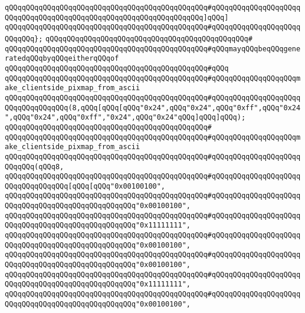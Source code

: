 \verb|qQQqqQQqqQQqqQQqqQQqqQQqqQQqqQQqqQQqqQQqqQQqqQQq#qQQqqQQqqQQqqQQqqQQqqQQqqQQqqQQqqQQqqQQqqQQqqQQqqQQqqQQqqQQqqQQqqQQq]qQQq]|\newline
\verb|qQQqqQQqqQQqqQQqqQQqqQQqqQQqqQQqqQQqqQQqqQQqqQQq#qQQqqQQqqQQqqQQqqQQqqQQqqQQq};|\newline
\verb|qQQqqQQqqQQqqQQqqQQqqQQqqQQqqQQqqQQqqQQqqQQqqQQq#|\newline
\verb|qQQqqQQqqQQqqQQqqQQqqQQqqQQqqQQqqQQqqQQqqQQqqQQq#qQQqmayqQQqbeqQQqgeneratedqQQqbyqQQqeitherqQQqof|\newline
\verb|qQQqqQQqqQQqqQQqqQQqqQQqqQQqqQQqqQQqqQQqqQQqqQQq#qQQq|\newline
\verb|qQQqqQQqqQQqqQQqqQQqqQQqqQQqqQQqqQQqqQQqqQQqqQQq#qQQqqQQqqQQqqQQqqQQqmake_clientside_pixmap_from_ascii|\newline
\verb|qQQqqQQqqQQqqQQqqQQqqQQqqQQqqQQqqQQqqQQqqQQqqQQq#qQQqqQQqqQQqqQQqqQQqqQQqqQQqqQQqqQQq(8,qQQq[qQQq[qQQq"0x24",qQQq"0x24",qQQq"0xff",qQQq"0x24",qQQq"0x24",qQQq"0xff","0x24",qQQq"0x24"qQQq]qQQq]qQQq);|\newline
\verb|qQQqqQQqqQQqqQQqqQQqqQQqqQQqqQQqqQQqqQQqqQQqqQQq#|\newline
\verb|qQQqqQQqqQQqqQQqqQQqqQQqqQQqqQQqqQQqqQQqqQQqqQQq#qQQqqQQqqQQqqQQqqQQqmake_clientside_pixmap_from_ascii|\newline
\verb|qQQqqQQqqQQqqQQqqQQqqQQqqQQqqQQqqQQqqQQqqQQqqQQq#qQQqqQQqqQQqqQQqqQQqqQQqqQQq(qQQq8,|\newline
\verb|qQQqqQQqqQQqqQQqqQQqqQQqqQQqqQQqqQQqqQQqqQQqqQQq#qQQqqQQqqQQqqQQqqQQqqQQqqQQqqQQqqQQq[qQQq[qQQq"0x00100100",|\newline
\verb|qQQqqQQqqQQqqQQqqQQqqQQqqQQqqQQqqQQqqQQqqQQqqQQq#qQQqqQQqqQQqqQQqqQQqqQQqqQQqqQQqqQQqqQQqqQQqqQQqqQQq"0x00100100",|\newline
\verb|qQQqqQQqqQQqqQQqqQQqqQQqqQQqqQQqqQQqqQQqqQQqqQQq#qQQqqQQqqQQqqQQqqQQqqQQqqQQqqQQqqQQqqQQqqQQqqQQqqQQq"0x11111111",|\newline
\verb|qQQqqQQqqQQqqQQqqQQqqQQqqQQqqQQqqQQqqQQqqQQqqQQq#qQQqqQQqqQQqqQQqqQQqqQQqqQQqqQQqqQQqqQQqqQQqqQQqqQQq"0x00100100",|\newline
\verb|qQQqqQQqqQQqqQQqqQQqqQQqqQQqqQQqqQQqqQQqqQQqqQQq#qQQqqQQqqQQqqQQqqQQqqQQqqQQqqQQqqQQqqQQqqQQqqQQqqQQq"0x00100100",|\newline
\verb|qQQqqQQqqQQqqQQqqQQqqQQqqQQqqQQqqQQqqQQqqQQqqQQq#qQQqqQQqqQQqqQQqqQQqqQQqqQQqqQQqqQQqqQQqqQQqqQQqqQQq"0x11111111",|\newline
\verb|qQQqqQQqqQQqqQQqqQQqqQQqqQQqqQQqqQQqqQQqqQQqqQQq#qQQqqQQqqQQqqQQqqQQqqQQqqQQqqQQqqQQqqQQqqQQqqQQqqQQq"0x00100100",|\newline
